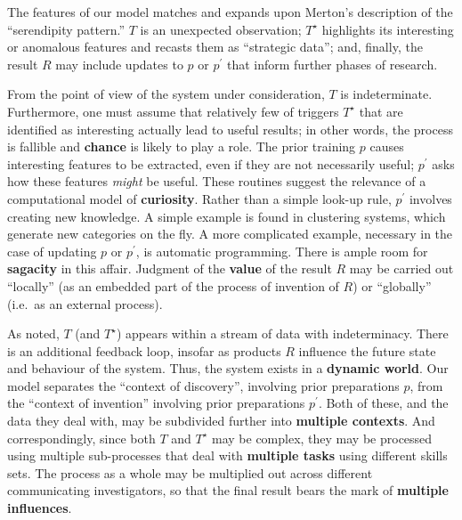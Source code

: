 The features of our model matches and expands upon Merton's \citeyear{merton1948bearing} description of the ``serendipity pattern.'' $T$ is an unexpected observation; $T^\star$ highlights its interesting or anomalous features and recasts them as ``strategic data''; and, finally, the result $R$ may include updates to $p$ or $p^{\prime}$ that inform further phases of research.  


From the point of view of the system under consideration, $T$ is
indeterminate.  Furthermore, one must assume that relatively few of
triggers $T^\star$ that are identified as interesting actually lead to
useful results; in other words, the process is fallible and
\textbf{chance} is likely to play a role.
%
The prior training $p$ causes interesting features
to be extracted, even if they are not necessarily useful; $p^{\prime}$
asks how these features \emph{might} be useful.  These routines 
suggest the relevance of a computational model of \textbf{curiosity}.
%
Rather than a simple look-up rule, $p^{\prime}$ involves creating new knowledge.  A simple example is found in clustering systems, which generate new categories on the fly.  A more complicated example, necessary in the case of updating $p$ or $p^{\prime}$, is automatic programming.  There is ample room for \textbf{sagacity} in this affair.
%
Judgment of the \textbf{value} of the result $R$ may be carried out
``locally'' (as an embedded part of the process of invention of $R$)
or ``globally'' (i.e.~as an external process).

As noted, $T$ (and $T^\star$) appears within a stream of data with
indeterminacy.  There is an additional feedback loop, insofar as
products $R$ influence the future state and behaviour of the system.
Thus, the system exists in a \textbf{dynamic world}.
%
Our model separates the
``context of discovery'', involving prior preparations $p$, from the
``context of invention'' involving prior preparations $p^{\prime}$.
Both of these, and the data they deal with, may be subdivided further into \textbf{multiple contexts}. 
%
And correspondingly, since both $T$ and $T^\star$ may be complex, they
may be processed using multiple sub-processes that deal with
\textbf{multiple tasks} using different skills sets.
%
The process as a whole may be multiplied out across different
communicating investigators, so that the final result bears the mark
of \textbf{multiple influences}.




